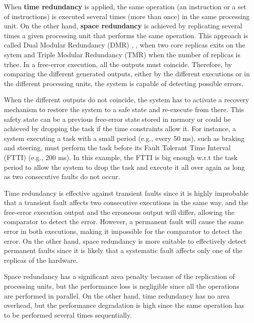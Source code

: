 When \textbf{time redundancy} is applied, the same operation (an instruction or a set of instructions) is executed several times (more than once) in the same processing unit. On the other hand, \textbf{space redundancy} is achieved by replicating several times a given processing unit that performs the same operation. This approach is called Dual Modular Redundancy (DMR) \cite{gomaa2003transient}, \cite{lafrieda2007utilizing}, \cite{mukherjee2002detailed} when two core replicas exits on the sytem and Triple Modular Redundancy (TMR) \cite{iturbe2019arm} when the number of replicas is trhee. In a free-error execution, all the outputs must coincide. Therefore, by comparing the different generated outputs, either by the different executions or in the different processing units, the system is capable of detecting possible errors. 

When the different outputs do not coincide, the system has to activate a recovery mechanism to restore the system to a safe state and re-execute from there. This safety state can be a previous free-error state stored in memory or could be achieved by dropping the task if the time constraints allow it. For instance, a system executing a task with a small period (e.g., every 50 ms), such as braking and steering, must perform the task before its Fault Tolerant Time Interval (FTTI) (e.g., 200 ms). In this example, the FTTI is big enough w.r.t the task period to allow the system to drop the task and execute it all over again as long as two consecutive faults do not occur.

Time redundancy is effective against transient faults since it is highly improbable that a transient fault affects two consecutive executions in the same way, and the free-error execution output and the erroneous output will differ, allowing the comparator to detect the error. However, a permanent fault will cause the same error in both executions, making it impossible for the comparator to detect the error. On the other hand, space redundancy is more suitable to effectively detect permanent faults since it is likely that a systematic fault affects only one of the replicas of the hardware. 

Space redundancy has a significant area penalty because of the replication of processing units, but the performance loss is negligible since all the operations are performed in parallel. On the other hand, time redundancy has no area overhead, but the performance degradation is high since the same operation has to be performed several times sequentially.

